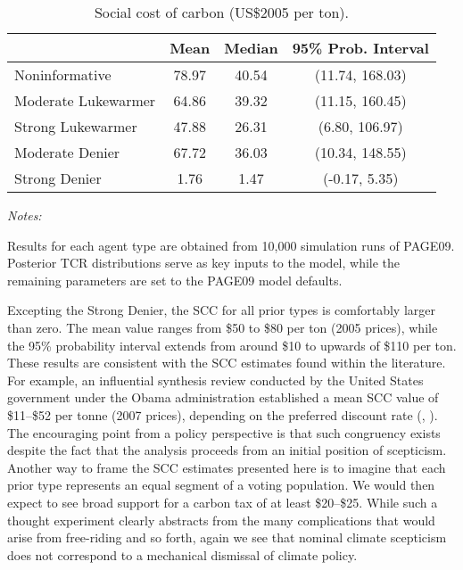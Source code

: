 \documentclass[smallextended]{svjour3}       %
\begin{document}
\begin{table}

\caption{\label{tab:scc_tab}Social cost of carbon (US\$2005 per ton). \label{tab:scc}}
\centering
\begin{threeparttable}
\begin{tabular}[t]{lccc}
\toprule
 & Mean & Median & 95\% Prob. Interval\\
\midrule
Noninformative & 78.97 & 40.54 & (11.74, 168.03)\\
Moderate Lukewarmer & 64.86 & 39.32 & (11.15, 160.45)\\
Strong Lukewarmer & 47.88 & 26.31 & (6.80, 106.97)\\
Moderate Denier & 67.72 & 36.03 & (10.34, 148.55)\\
Strong Denier & 1.76 & 1.47 & (-0.17, 5.35)\\
\bottomrule
\end{tabular}
\begin{tablenotes}[para]
\item \textit{Notes:} 
\item Results for each agent type are obtained from 10,000 simulation runs of PAGE09. Posterior TCR distributions serve as key inputs to the model, while the remaining parameters are set to the PAGE09 model defaults.
\end{tablenotes}
\end{threeparttable}
\end{table}

Excepting the Strong Denier, the SCC for all prior types is comfortably
larger than zero. The mean value ranges from \$50 to \$80 per ton (2005
prices), while the 95\% probability interval extends from around \$10 to
upwards of \$110 per ton. These results are consistent with the SCC
estimates found within the literature. For example, an influential
synthesis review conducted by the United States government under the
Obama administration established a mean SCC value of \$11--\$52 per
tonne (2007 prices), depending on the preferred discount rate
(\cite{iwg2010scc}, \cite{iwg2013scc}). The encouraging point from a
policy perspective is that such congruency exists despite the fact that
the analysis proceeds from an initial position of scepticism. Another
way to frame the SCC estimates presented here is to imagine that each
prior type represents an equal segment of a voting population. We would
then expect to see broad support for a carbon tax of at least
\$20--\$25. While such a thought experiment clearly abstracts from the
many complications that would arise from free-riding and so forth, again
we see that nominal climate scepticism does not correspond to a
mechanical dismissal of climate policy.
\end{document}
